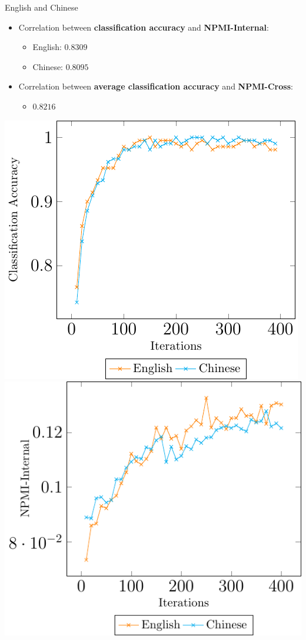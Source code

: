 \documentclass[compress]{beamer}
\begin{document}
	
	\begin{frame}{English and Chinese}
		\begin{itemize}
			\item Correlation between \textbf{classification accuracy} and \textbf{NPMI-Internal}:
			\begin{itemize}
				\item English: $0.8309$
				\item Chinese: $0.8095$
			\end{itemize}
			\item Correlation between \textbf{average classification accuracy} and \textbf{NPMI-Cross}:
			\begin{itemize}
				\item $0.8216$
			\end{itemize}			
		\end{itemize}
		\begin{center}
			\includegraphics[height=0.5\textheight]{multilingual_itm/clf-en-cmn.pdf}
			\includegraphics[height=0.5\textheight]{multilingual_itm/npmi-en-cmn.pdf}
		\end{center}
	\end{frame}
	
\end{document}
